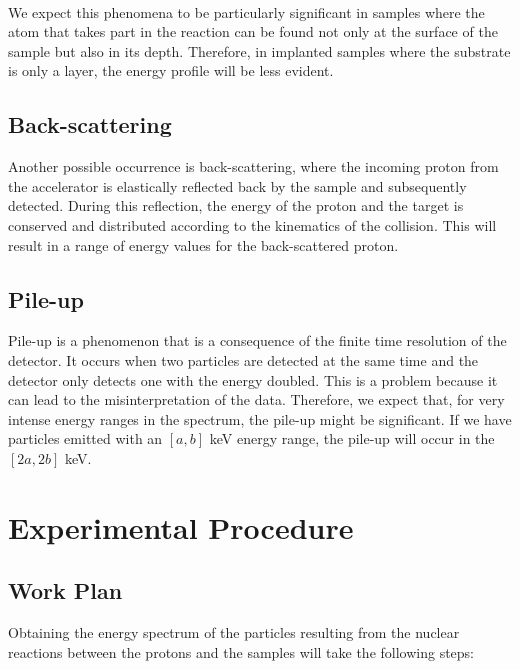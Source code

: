 \documentclass{article}
\begin{document}
\begin{multicols}{2}
\paragraph{}

We expect this phenomena to be particularly significant in samples where the atom that takes part in the reaction can be found not only at the surface of the sample but also in its depth.
Therefore, in implanted samples where the substrate is only a layer, the energy profile will be less evident.

\subsection{Back-scattering}
    \label{sec:elastic_back}

Another possible occurrence is back-scattering, where the incoming proton from the accelerator is elastically reflected back by the sample and subsequently detected.
During this reflection, the energy of the proton and the target is conserved and distributed according to the kinematics of the collision. This will result in a range of energy values for the back-scattered proton.

\subsection{Pile-up}
    \label{sec:pileup}

Pile-up is a phenomenon that is a consequence of the finite time resolution of the detector. It occurs when two particles are detected at the same time and the detector only detects one with the energy doubled. This is a problem because it can lead to the misinterpretation of the data.
Therefore, we expect that, for very intense energy ranges in the spectrum, the pile-up might be significant.
If we have particles emitted with an $[a,b]$ keV energy range, the pile-up will occur in the $[2a,2b]$ keV.

\section{Experimental Procedure}
    \label{sec:experimentalprocedure}

\subsection{Work Plan}
    \label{sec:workplan}

Obtaining the energy spectrum of the particles resulting from the nuclear reactions between the protons and the samples will take the following steps:


\end{multicols}
\end{document}
